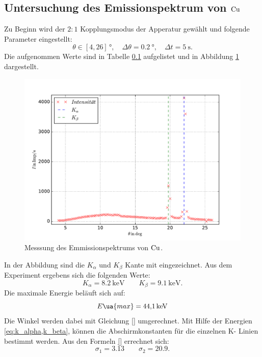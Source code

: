 \subsection{Untersuchung des Emissionspektrum von $\ce{Cu}$}
Zu Beginn wird der $2:1$ Kopplungsmodus der Apperatur gewählt und folgende Parameter eingestellt:
\begin{equation*}
  \theta\in\left[4,26\right]\,\si{\degree},\quad \Delta\theta=\SI{0.2}{\degree}, \quad \Delta t=\SI{5}{\second}.
\end{equation*}
Die aufgenommen Werte sind in Tabelle \ref{} aufgelistet und in Abbildung \ref{fig: emission_cu} dargestellt.

\begin{figure}
  \centering
  \includegraphics[width=0.8 \textwidth]{../Messdaten/emission_cu.pdf}
  \caption{Messsung des Emmissionspektrums von $\ce{Cu}$.} %
  \label{fig: emission_cu}
\end{figure}
In der Abbildung sind die $K_\alpha$ und $K_\beta$ Kante mit eingezeichnet.
Aus dem Experiment ergebens sich die folgenden Werte:
\begin{equation}
  \label{eq:k_alpha,k_beta}
  K_\alpha=\SI{8.2}{\kilo\eV} \qquad   K_\beta=\SI{9.1}{\kilo\eV}.
\end{equation}
Die maximale Energie beläuft sich auf:
\begin{equation}
  \label{eq: maximale_energie}
  E\ua{max}=\SI{44.1}{\kilo\eV}
\end{equation}
Die Winkel werden dabei mit Gleichung \eqref{} umgerechnet.
Mit Hilfe der Energien \eqref{eq:k_alpha,k_beta}, können die Abschirmkonstanten
für die einzelnen K- Linien bestimmt werden.
Aus den Formeln \eqref{} errechnet sich:
\begin{equation}
   \label{eq:abschirm}
   \sigma_1=3.13 \qquad \sigma_2=20.9.
\end{equation}

